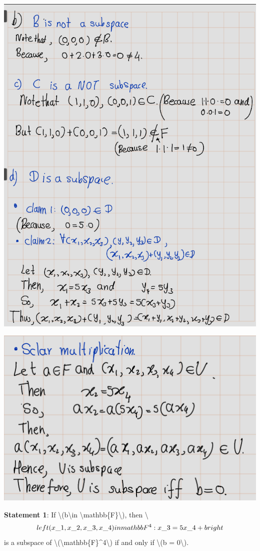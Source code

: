 \documentclass[
]{book}
\theoremstyle{definition}
\theoremstyle{definition}
\theoremstyle{definition}
\theoremstyle{definition}
\theoremstyle{remark}
\begin{document}
\begin{enumerate}
  \includegraphics{fig/Ex1C/Ex1-2.png}

  \includegraphics{fig/Ex1C/Ex1-3.png}
\end{enumerate}

\textbf{Statement 1}: If \textbackslash(b\textbackslash in \textbackslash mathbb\{F\}\textbackslash), then \textbackslash{}\[\\left\\{(x\_1,x\_2,x\_3,x\_4)\\in \\mathbb{F}^4:x\_3=5x\_4+b\\right\\}\\\] is a subspace of \textbackslash(\textbackslash mathbb\{F\}\^{}4\textbackslash) if and only if \textbackslash(b = 0\textbackslash).
\end{document}
